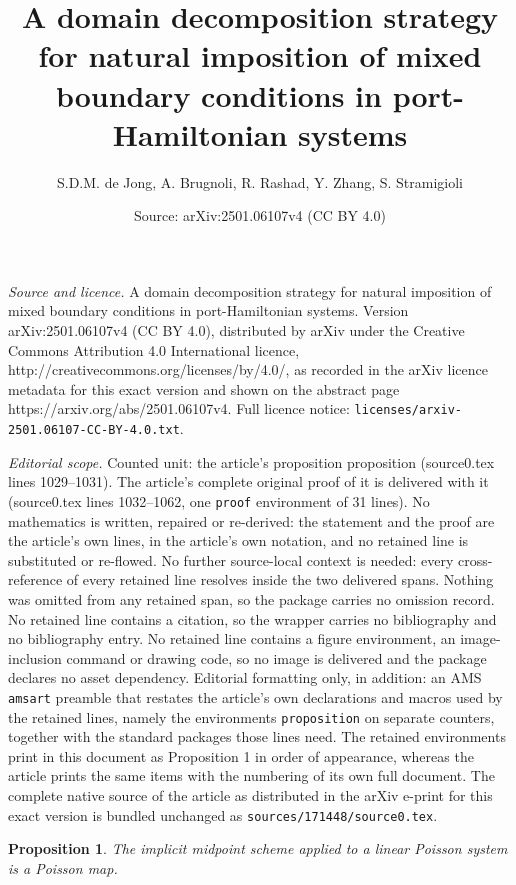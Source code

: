 \documentclass[10pt,a4paper]{amsart}
\title{A domain decomposition strategy for natural imposition of mixed boundary conditions in port-Hamiltonian systems}
\author{S.D.M. de Jong, A. Brugnoli, R. Rashad, Y. Zhang, S. Stramigioli}
\date{Source: arXiv:2501.06107v4 (CC BY 4.0)}
\newtheorem{proposition}{Proposition}
\begin{document}
\maketitle

\noindent\emph{Source and licence.} A domain decomposition strategy for natural imposition of mixed boundary conditions in port-Hamiltonian systems. Version arXiv:2501.06107v4 (CC BY 4.0), distributed by arXiv under the Creative Commons Attribution 4.0 International licence, http://creativecommons.org/licenses/by/4.0/, as recorded in the arXiv licence metadata for this exact version and shown on the abstract page https://arxiv.org/abs/2501.06107v4. Full licence notice: \texttt{licenses/arxiv-2501.06107-CC-BY-4.0.txt}.\par\smallskip

\noindent\textit{Editorial scope.} Counted unit: the article's proposition proposition (source0.tex lines 1029--1031). The article's complete original proof of it is delivered with it (source0.tex lines 1032--1062, one \texttt{proof} environment of 31 lines). No mathematics is written, repaired or re-derived: the statement and the proof are the article's own lines, in the article's own notation, and no retained line is substituted or re-flowed.  No further source-local context is needed: every cross-reference of every retained line resolves inside the two delivered spans.  Nothing was omitted from any retained span, so the package carries no omission record.  No retained line contains a citation, so the wrapper carries no bibliography and no bibliography entry.  No retained line contains a figure environment, an image-inclusion command or drawing code, so no image is delivered and the package declares no asset dependency.  Editorial formatting only, in addition: an AMS \texttt{amsart} preamble that restates the article's own declarations and macros used by the retained lines, namely the environments \texttt{proposition} on separate counters, together with the standard packages those lines need.  The retained environments print in this document as Proposition 1 in order of appearance, whereas the article prints the same items with the numbering of its own full document.  The complete native source of the article as distributed in the arXiv e-print for this exact version is bundled unchanged as \texttt{sources/171448/source0.tex}.
\begin{proposition}
The implicit midpoint scheme applied to a linear Poisson system is a Poisson map.
\end{proposition}
\end{document}
